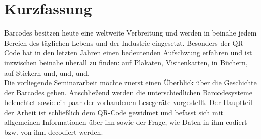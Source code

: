 \setcounter{page}{1}
\onehalfspacing
{}
\section*{Kurzfassung}
Barcodes besitzen heute eine weltweite Verbreitung und werden in beinahe jedem Bereich des täglichen Lebens und der Industrie eingesetzt. Besonders der QR-Code hat in den letzten Jahren einen bedeutenden Aufschwung erfahren und ist inzwischen beinahe überall zu finden: auf Plakaten, Visitenkarten, in Büchern, auf Stickern und, und, und.\\
Die vorliegende Seminararbeit möchte zuerst einen Überblick über die Geschichte der Barcodes geben. Anschließend werden die unterschiedlichen Barcodesysteme beleuchtet sowie ein paar der vorhandenen Lesegeräte vorgestellt.
Der Hauptteil der Arbeit ist schließlich dem QR-Code gewidmet und befasst sich mit allgemeinen Informationen über ihn sowie der Frage, wie Daten in ihm codiert bzw. von ihm decodiert werden.
\pagebreak
